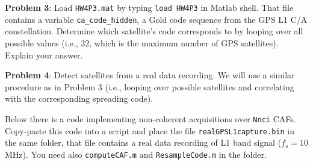 \documentclass[11pt]{article}
\begin{document}
\textbf{Problem 3}:
Load \verb|HW4P3.mat| by typing \verb|load HW4P3| in Matlab shell. That file contains a variable \verb|ca_code_hidden|, a Gold code sequence from the GPS L1 C/A constellation. Determine which satellite's code corresponds to by looping over all possible values (i.e., $32$, which is the maximum number of GPS satellites). Explain your answer.


\vspace*{.5cm}

\textbf{Problem 4}:
Detect satellites from a real data recording. We will use a similar procedure as in Problem 3 (i.e., looping over possible satellites and correlating with the corresponding spreading code). 

Below there is a code implementing non-coherent acquisitions over \verb|Nnci| CAFs. Copy-paste this code into a script and place the file \verb|realGPSL1capture.bin| in the same folder, that file contains a real data recording of L1 band signal ($f_s=10$ MHz). You need also \verb|computeCAF.m| and \verb|ResampleCode.m| in the folder.
\end{document}
